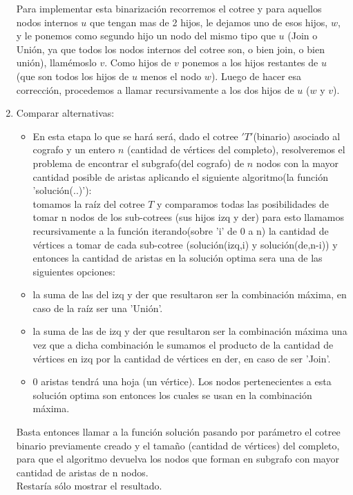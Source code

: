 \begin{enumerate}
Para implementar esta binarización recorremos el cotree y para aquellos nodos internos $u$ que tengan mas de 2 hijos, le dejamos uno de esos hijos, $w$, y le ponemos como segundo hijo un nodo del mismo tipo que $u$ (Join o Unión, ya que todos los nodos internos del cotree son, o bien join, o bien unión), llamémoslo $v$. Como hijos de $v$ ponemos a los hijos restantes de $u$ (que son todos los hijos de $u$ menos el nodo $w$). Luego de hacer esa corrección, procedemos a llamar recursivamente a los dos hijos de $u$ ($w$ y $v$).
\item Comparar alternativas:
\begin{itemize}
\item En esta etapa lo que se hará será, dado el cotree $'T'$(binario) asociado al cografo y un entero $n$ (cantidad de vértices del completo), resolveremos el problema de encontrar el subgrafo(del cografo) de $n$ nodos con la mayor cantidad posible de aristas aplicando el siguiente algoritmo(la función 'solución(..)'):\\
tomamos la raíz del cotree $T$ y comparamos todas las posibilidades de tomar n nodos de los sub-cotrees (sus hijos izq y der) para esto llamamos recursivamente a la función iterando(sobre 'i' de 0 a n) la cantidad de vértices a tomar de cada sub-cotree (solución(izq,i) y solución(de,n-i)) y entonces la cantidad de aristas en la solución optima sera una de las siguientes opciones:
  \item la suma de las del izq y der que resultaron ser la combinación máxima, en caso de la raíz ser una 'Unión'.
  \item la suma de las de izq y der que resultaron ser la combinación máxima una vez que a dicha combinación le sumamos el producto de la cantidad de vértices en izq por la cantidad de vértices en der, en caso de ser 'Join'.
 \item 0 aristas tendrá una hoja (un vértice).
 Los nodos pertenecientes a esta solución optima son entonces los cuales se usan en la combinación máxima.
\end{itemize}
Basta entonces llamar a la función solución pasando por parámetro el cotree binario previamente creado y  el tamaño (cantidad de vértices) del completo, para que el algoritmo devuelva los nodos que forman en subgrafo con mayor cantidad de aristas de n nodos.\\
Restaría sólo mostrar el resultado.

\end{enumerate}

